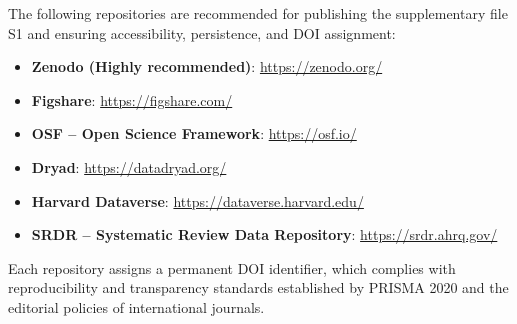 The following repositories are recommended for publishing the supplementary file S1 and ensuring accessibility, persistence, and DOI assignment:

\begin{itemize}
    \item \textbf{Zenodo (Highly recommended)}: \url{https://zenodo.org/}
    \item \textbf{Figshare}: \url{https://figshare.com/}
    \item \textbf{OSF -- Open Science Framework}: \url{https://osf.io/}
    \item \textbf{Dryad}: \url{https://datadryad.org/}
    \item \textbf{Harvard Dataverse}: \url{https://dataverse.harvard.edu/}
    \item \textbf{SRDR -- Systematic Review Data Repository}: \url{https://srdr.ahrq.gov/}
\end{itemize}

Each repository assigns a permanent DOI identifier, which complies with reproducibility and transparency standards established by PRISMA 2020 and the editorial policies of international journals.
